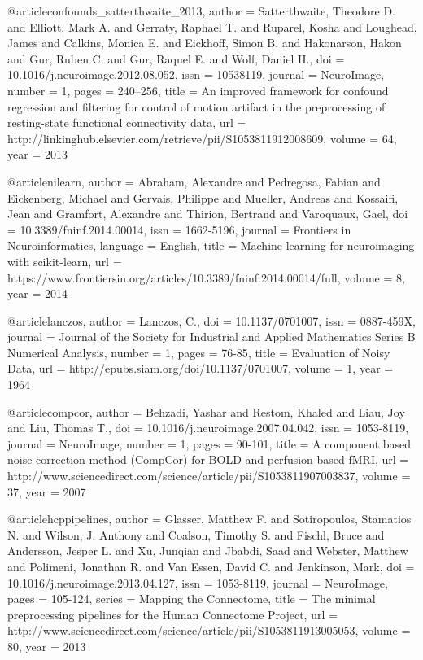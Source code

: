 @article{confounds_satterthwaite_2013,
    author = {Satterthwaite, Theodore D. and Elliott, Mark A. and Gerraty, Raphael T. and Ruparel, Kosha and Loughead, James and Calkins, Monica E. and Eickhoff, Simon B. and Hakonarson, Hakon and Gur, Ruben C. and Gur, Raquel E. and Wolf, Daniel H.},
    doi = {10.1016/j.neuroimage.2012.08.052},
    issn = {10538119},
    journal = {NeuroImage},
    number = 1,
    pages = {240--256},
    title = {{An improved framework for confound regression and filtering for control of motion artifact in the preprocessing of resting-state functional connectivity data}},
    url = {http://linkinghub.elsevier.com/retrieve/pii/S1053811912008609},
    volume = 64,
    year = 2013
}


@article{nilearn,
    author = {Abraham, Alexandre and Pedregosa, Fabian and Eickenberg, Michael and Gervais, Philippe and Mueller, Andreas and Kossaifi, Jean and Gramfort, Alexandre and Thirion, Bertrand and Varoquaux, Gael},
    doi = {10.3389/fninf.2014.00014},
    issn = {1662-5196},
    journal = {Frontiers in Neuroinformatics},
    language = {English},
    title = {Machine learning for neuroimaging with scikit-learn},
    url = {https://www.frontiersin.org/articles/10.3389/fninf.2014.00014/full},
    volume = 8,
    year = 2014
}

@article{lanczos,
    author = {Lanczos, C.},
    doi = {10.1137/0701007},
    issn = {0887-459X},
    journal = {Journal of the Society for Industrial and Applied Mathematics Series B Numerical Analysis},
    number = 1,
    pages = {76-85},
    title = {Evaluation of Noisy Data},
    url = {http://epubs.siam.org/doi/10.1137/0701007},
    volume = 1,
    year = 1964
}

@article{compcor,
    author = {Behzadi, Yashar and Restom, Khaled and Liau, Joy and Liu, Thomas T.},
    doi = {10.1016/j.neuroimage.2007.04.042},
    issn = {1053-8119},
    journal = {NeuroImage},
    number = 1,
    pages = {90-101},
    title = {A component based noise correction method ({CompCor}) for {BOLD} and perfusion based fMRI},
    url = {http://www.sciencedirect.com/science/article/pii/S1053811907003837},
    volume = 37,
    year = 2007
}

@article{hcppipelines,
    author = {Glasser, Matthew F. and Sotiropoulos, Stamatios N. and Wilson, J. Anthony and Coalson, Timothy S. and Fischl, Bruce and Andersson, Jesper L. and Xu, Junqian and Jbabdi, Saad and Webster, Matthew and Polimeni, Jonathan R. and Van Essen, David C. and Jenkinson, Mark},
    doi = {10.1016/j.neuroimage.2013.04.127},
    issn = {1053-8119},
    journal = {NeuroImage},
    pages = {105-124},
    series = {Mapping the Connectome},
    title = {The minimal preprocessing pipelines for the Human Connectome Project},
    url = {http://www.sciencedirect.com/science/article/pii/S1053811913005053},
    volume = 80,
    year = 2013
}

